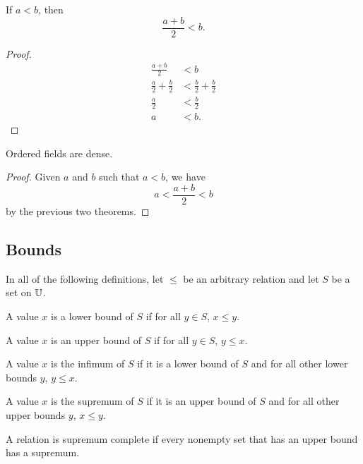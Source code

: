 \documentclass[../math.tex]{subfiles}
\begin{document}
\begin{theorem}
    If $a < b$, then
    \[
        \frac{a + b}{2} < b.
    \]
\end{theorem}
\begin{proof}
    \begin{align*}
        \frac{a + b}{2} &< b \\
        \frac{a}{2} + \frac{b}{2} &< \frac{b}{2} + \frac{b}{2} \\
        \frac{a}{2} &< \frac{b}{2} \\
        a &< b.
    \end{align*}
\end{proof}

\begin{instance}
    Ordered fields are dense.
\end{instance}
\begin{proof}
    Given $a$ and $b$ such that $a < b$, we have
    \[
        a < \frac{a + b}{2} < b
    \]
    by the previous two theorems.
\end{proof}

\subsection{Bounds}

In all of the following definitions, let $\leq$ be an arbitrary relation and let
$S$ be a set on $\mathbb{U}$.

\begin{definition}
    A value $x$ is a lower bound of $S$ if for all $y \in S$, $x \leq y$.
\end{definition}

\begin{definition}
    A value $x$ is an upper bound of $S$ if for all $y \in S$, $y \leq x$.
\end{definition}

\begin{definition}
    A value $x$ is the infimum of $S$ if it is a lower bound of $S$ and for all
    other lower bounds $y$, $y \leq x$.
\end{definition}

\begin{definition}
    A value $x$ is the supremum of $S$ if it is an upper bound of $S$ and for
    all other upper bounds $y$, $x \leq y$.
\end{definition}

\begin{class}
    A relation is supremum complete if every nonempty set that has an upper
    bound has a supremum.
\end{class}
\end{document}
